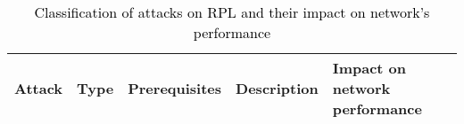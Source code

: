 \documentclass[10pt,journal,sort & compress]{IEEEtran}
\begin{document}
\begin{table*}
	\centering
	\caption{\textcolor{black}{Classification of attacks on RPL and their impact on network's performance}}
	\label{table:COAIP}
	\color{black}\begin{supertabular}[l]{|p{1.6cm}|p{1.3cm}|p{1.5cm}|p{5.8cm}|p{5.8cm}|}
		\hline
		\textbf{Attack}               & \textbf{Type}    & \textbf{Prerequisites}       & \textbf{Description}                                                                                                                                                                                & \textbf{Impact on network performance}                                                                                                                                                                                \\ \hline
		

\end{supertabular}
\end{table*}
\end{document}
